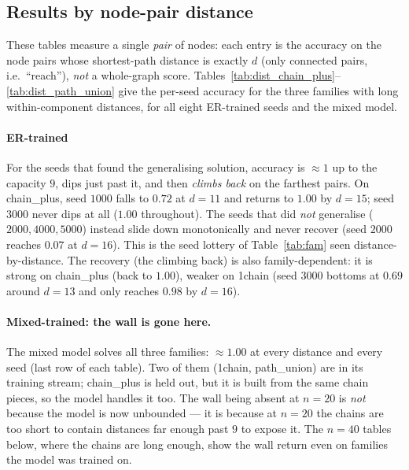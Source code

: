 \documentclass[11pt,a4paper]{article}
\begin{document}
\subsection{Results by node-pair distance}
\label{sec:perseed}

These tables measure a single \emph{pair} of nodes:
each entry is the accuracy on the node pairs whose shortest-path distance is exactly $d$ (only
connected pairs, i.e.\ ``reach''), \emph{not} a whole-graph score. 
Tables~\ref{tab:dist_chain_plus}--\ref{tab:dist_path_union} give the per-seed accuracy for the three families with
long within-component distances, for all eight ER-trained seeds and the mixed model.

\paragraph{ER-trained} For the seeds
that found the generalising solution, accuracy is $\approx1$ up to the capacity $9$, dips just
past it, and then \emph{climbs back} on the farthest pairs. On chain\_plus,
seed $1000$ falls to $0.72$ at $d=11$ and returns to $1.00$ by $d=15$; seed $3000$ never dips
at all ($1.00$ throughout). The seeds that did \emph{not} generalise ($2000,4000,5000$)
instead slide down monotonically and never recover (seed $2000$ reaches $0.07$ at $d=16$).
This is the seed lottery of Table~\ref{tab:fam} seen distance-by-distance. The recovery (the climbing back) is
also family-dependent: it is strong on chain\_plus (back to $1.00$), weaker on 1chain (seed
$3000$ bottoms at $0.69$ around $d=13$ and only reaches $0.98$ by $d=16$).

\paragraph{Mixed-trained: the wall is gone here.} The mixed model solves all three families:
$\approx1.00$ at every distance and every seed (last row of each table). Two of them (1chain,
path\_union) are in its training stream; chain\_plus is held out, but it is built from the same
chain pieces, so the model handles it too. The wall being absent at $n=20$ is \emph{not} because
the model is now unbounded --- it is because at $n=20$ the chains are too short to contain
distances far enough past $9$ to expose it. The $n=40$ tables below, where the chains are long
enough, show the wall return even on families the model was trained on.
\end{document}
